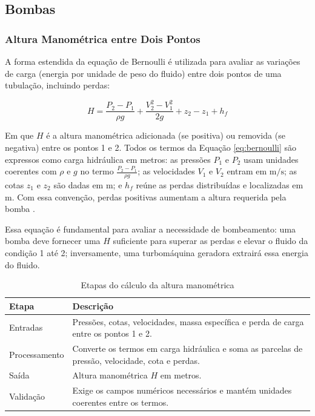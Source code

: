 \subsection{Bombas}

\subsubsection{Altura Manométrica entre Dois Pontos}

A forma estendida da equação de Bernoulli é utilizada para avaliar as variações de carga (energia por unidade de peso do fluido) entre dois pontos de uma tubulação, incluindo perdas:

\begin{equation}
H = \frac{P_{2} - P_{1}}{\rho g} + \frac{V_{2}^{2} - V_{1}^{2}}{2 g} + z_{2} - z_{1} + h_f
\label{eq:bernoulli}
\end{equation}

Em que $H$ é a altura manométrica adicionada (se positiva) ou removida (se negativa) entre os pontos 1 e 2. Todos os termos da Equação \ref{eq:bernoulli} são expressos como carga hidráulica em metros: as pressões $P_1$ e $P_2$ usam unidades coerentes com $\rho$ e $g$ no termo $\frac{P_{2} - P_{1}}{\rho g}$; as velocidades $V_1$ e $V_2$ entram em $\mathrm{m/s}$; as cotas $z_1$ e $z_2$ são dadas em $\mathrm{m}$; e $h_f$ reúne as perdas distribuídas e localizadas em $\mathrm{m}$. Com essa convenção, perdas positivas aumentam a altura requerida pela bomba \cite{white2018}.

Essa equação é fundamental para avaliar a necessidade de bombeamento: uma bomba deve fornecer uma $H$ suficiente para superar as perdas e elevar o fluido da condição 1 até 2; inversamente, uma turbomáquina geradora extrairá essa energia do fluido.

\begin{table}[H]
    \centering
    \caption{Etapas do cálculo da altura manométrica}
    \label{tab:fluxo-altura-manometrica}
    \small
    \begin{tabular}{p{}p{}}
        \hline
        \textbf{Etapa} & \textbf{Descrição} \\
        \hline
        Entradas & Pressões, cotas, velocidades, massa específica e perda de carga entre os pontos 1 e 2. \\
        Processamento & Converte os termos em carga hidráulica e soma as parcelas de pressão, velocidade, cota e perdas. \\
        Saída & Altura manométrica $H$ em metros. \\
        Validação & Exige os campos numéricos necessários e mantém unidades coerentes entre os termos. \\
        \hline
    \end{tabular}
\end{table}

